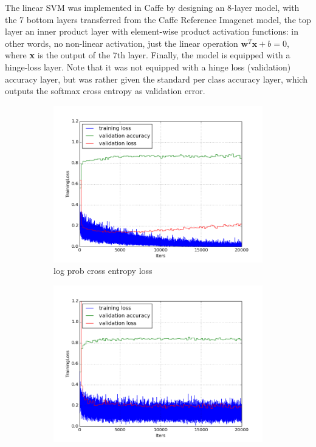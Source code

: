 \documentclass[a4paper,11pt]{article}
\begin{document}
The linear SVM was implemented in Caffe by designing an 8-layer model, with the 7 bottom layers transferred from the Caffe Reference Imagenet model, the top layer an inner product layer with element-wise product activation functions: in other words, no non-linear activation, just the linear operation $\textbf{w}^T \textbf{x} + b = 0$, where \textbf{x} is the output of the 7th layer. Finally, the model is equipped with a hinge-loss layer. Note that it was not equipped with a hinge loss (validation) accuracy layer, but was rather given the standard per class accuracy layer, which outputs the softmax cross entropy as validation error. 

\begin{figure}
    \centering
    \begin{minipage}[b]{\textwidth}
      \begin{subfigure}{.5\textwidth} 
        \centering
        \includegraphics[scale=0.4]{images/plot_clampdet_none.png}
        \caption{log prob cross entropy loss}\label{fig:2a}
      \end{subfigure}%
      \begin{subfigure}{.5\textwidth} 
        \centering
        \includegraphics[scale=0.4]{images/plot_clampdet_linSVM.png}

\end{subfigure}
\end{minipage}
\end{figure}
\end{document}
